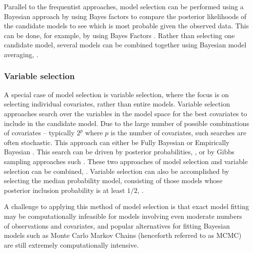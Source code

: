 Parallel to the frequentist approaches, model selection can be performed using
a Bayesian approach by using Bayes factors to compare the posterior likelihoods
of the candidate models to see which is most probable given the observed data.
This can be done, for example, by using Bayes Factors \citep{Kass1993}. Rather
than selecting one candidate model, several models can be combined together
using Bayesian model  averaging, \citep{Hoeting1999, Raftery1997,
Fernandez2001, Papaspiliopoulos2016}.

\subsubsection{Variable selection}

A special case of model selection is variable selection, where the focus is on
selecting individual covariates, rather than entire models. Variable selection
approaches search over the variables in the model space for the best covariates
to include in the candidate model. Due to the large number of possible
combinations of covariates -- typically $2^p$ where $p$ is the number of
covariates, such searches are often stochastic. This approach can either be
Fully Bayesian or Empirically Bayesian \citep{Cui2008}.  This search can be
driven by posterior probabilities,  \cite{Casella2006}, or by Gibbs sampling
approaches such  \cite{George1993}. These two approaches of model selection and
variable selection can be combined,  \cite{Geweke1996}. Variable selection can
also be accomplished by selecting the median probability model, consisting of
those models whose posterior inclusion probability is at least $1/2$,
\cite{Barbieri2004}.

A challenge to applying this method of model selection is that exact model
fitting may be computationally infeasible for models involving even moderate
numbers of observations and covariates, and popular alternatives for fitting
Bayesian models such as Monte Carlo Markov Chains (henceforth referred to as
MCMC) are still extremely computationally intensive.




